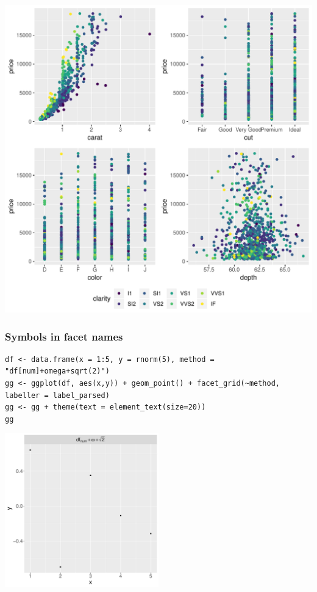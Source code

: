 \documentclass{article}
\begin{document}
\begin{center}
\includegraphics[width=.9\linewidth]{./figures/fig-combine.pdf}
\end{center}

\subsubsection{Symbols in facet names}
\label{sec:org5706b28}

\lstset{language=r,label= ,caption= ,captionpos=b,numbers=none}
\begin{lstlisting}
df <- data.frame(x = 1:5, y = rnorm(5), method = "df[num]+omega+sqrt(2)")
gg <- ggplot(df, aes(x,y)) + geom_point() + facet_grid(~method, labeller = label_parsed)
gg <- gg + theme(text = element_text(size=20))
gg
\end{lstlisting}

\begin{center}
\includegraphics[trim={0 0 0 0},width=0.5\textwidth]{./figures/fig-symbolfacet.pdf}
\end{center}
\end{document}
